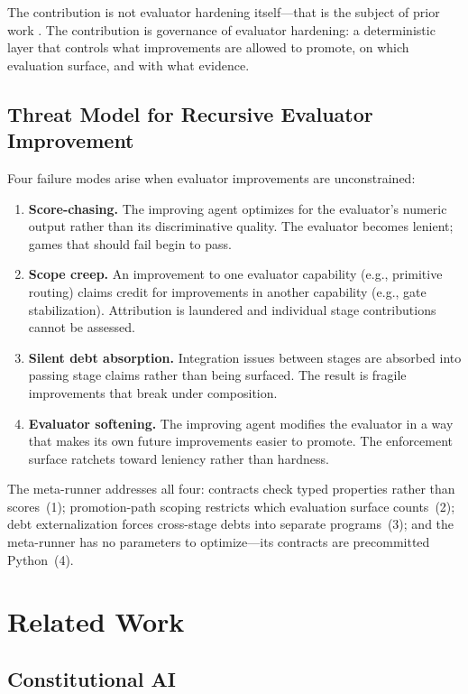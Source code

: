 \documentclass[11pt]{article}
\begin{document}
The contribution is not evaluator hardening itself---that is the subject of prior work \citep{alami2025b}. The contribution is governance of evaluator hardening: a deterministic layer that controls what improvements are allowed to promote, on which evaluation surface, and with what evidence.

\subsection{Threat Model for Recursive Evaluator Improvement}

Four failure modes arise when evaluator improvements are unconstrained:

\begin{enumerate}[nosep]
\item \textbf{Score-chasing.} The improving agent optimizes for the evaluator's numeric output rather than its discriminative quality. The evaluator becomes lenient; games that should fail begin to pass.
\item \textbf{Scope creep.} An improvement to one evaluator capability (e.g., primitive routing) claims credit for improvements in another capability (e.g., gate stabilization). Attribution is laundered and individual stage contributions cannot be assessed.
\item \textbf{Silent debt absorption.} Integration issues between stages are absorbed into passing stage claims rather than being surfaced. The result is fragile improvements that break under composition.
\item \textbf{Evaluator softening.} The improving agent modifies the evaluator in a way that makes its own future improvements easier to promote. The enforcement surface ratchets toward leniency rather than hardness.
\end{enumerate}

The meta-runner addresses all four: contracts check typed properties rather than scores~(1); promotion-path scoping restricts which evaluation surface counts~(2); debt externalization forces cross-stage debts into separate programs~(3); and the meta-runner has no parameters to optimize---its contracts are precommitted Python~(4).


\section{Related Work}

\subsection{Constitutional AI}
\end{document}
